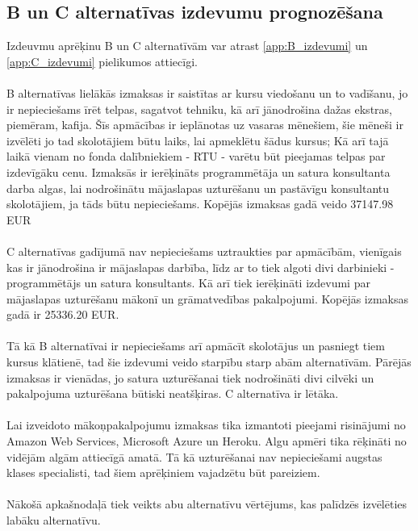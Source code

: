 \subsection{B un C alternatīvas izdevumu prognozēšana}
Izdeuvmu aprēķinu B un C alternatīvām var atrast \ref{app:B_izdevumi} un \ref{app:C_izdevumi} pielikumos attiecīgi.
\paragraph{}
B alternatīvas lielākās izmaksas ir saistītas ar kursu viedošanu un to vadīšanu, jo ir nepieciešams īrēt telpas,
sagatvot tehniku, kā arī jānodrošina dažas ekstras, piemēram, kafija. Šīs apmācības ir ieplānotas uz vasaras mēnešiem,
šie mēneši ir izvēlēti jo tad skolotājiem būtu laiks, lai apmeklētu šādus kursus; Kā arī tajā laikā vienam no fonda 
dalībniekiem - RTU - varētu būt pieejamas telpas par izdevīgāku cenu. Izmaksās ir ierēķināts programmētāja un satura
konsultanta darba algas, lai nodrošinātu mājaslapas uzturēšanu un pastāvīgu konsultantu skolotājiem, ja tāds būtu
nepieciešams. Kopējās izmaksas gadā veido 37147.98 EUR
\paragraph{}
C alternatīvas gadījumā nav nepieciešams uztraukties par apmācībām, vienīgais kas ir jānodrošina ir mājaslapas darbība,
līdz ar to tiek algoti divi darbinieki - programmētājs un satura konsultants. Kā arī tiek ierēķināti izdevumi par
mājaslapas uzturēšanu mākonī un grāmatvedības pakalpojumi. Kopējās izmaksas gadā ir 25336.20 EUR.
\paragraph{}
Tā kā B alternatīvai ir nepieciešams arī apmācīt skolotājus un pasniegt tiem kursus klātienē, tad šie izdevumi veido
starpību starp abām alternatīvām. Pārējās izmaksas ir vienādas, jo satura uzturēšanai tiek nodrošināti divi cilvēki un
pakalpojuma uzturēšana būtiski neatšķiras. C alternatīva ir lētāka.
\paragraph{}
Lai izveidoto mākoņpakalpojumu izmaksas tika izmantoti pieejami risinājumi no Amazon Web Services, Microsoft Azure un
Heroku. Algu apmēri tika rēķināti no vidējām algām attiecīgā amatā. Tā kā uzturēšanai nav nepieciešami augstas klases
specialisti, tad šiem aprēķiniem vajadzētu būt pareiziem.
\paragraph{}
Nākošā apkašnodaļā tiek veikts abu alternatīvu vērtējums, kas palīdzēs izvēlēties labāku alternatīvu.
